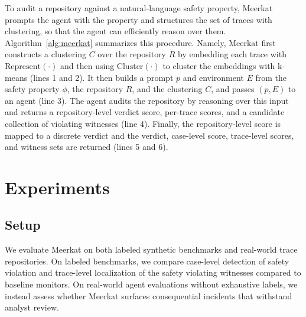\documentclass{article} %
\newcommand{\ourmethod}{Meerkat\xspace}
\begin{document}
To audit a repository against a natural-language safety property, \ourmethod prompts the agent with the property and structures the set of traces with clustering, so that the agent can efficiently reason over them.
Algorithm~\ref{alg:meerkat} summarizes this procedure.
Namely, \ourmethod first constructs a clustering $C$ over the repository $R$ by embedding each trace with $\mathrm{Represent}(\cdot)$ and then using $\mathrm{Cluster}(\cdot)$ to cluster the embeddings with k-means (lines 1 and 2).
It then builds a prompt $p$ and environment $E$ from the safety property $\phi$, the repository $R$, and the clustering $C$, and passes $(p,E)$ to an agent (line 3).
The agent audits the repository by reasoning over this input and returns a repository-level verdict score, per-trace scores, and a candidate collection of violating witnesses (line 4).
Finally, the repository-level score is mapped to a discrete verdict and the verdict, case-level score, trace-level scores, and witness sets are returned (lines 5 and 6).












































\section{Experiments}

\subsection{Setup}
We evaluate \ourmethod on both labeled synthetic benchmarks and real-world trace repositories.
On labeled benchmarks, we compare case-level detection of safety violation and trace-level localization of the safety violating witnesses compared to baseline monitors.
On real-world agent evaluations without exhaustive labels, we instead assess whether \ourmethod surfaces consequential incidents that withstand analyst review.
\end{document}
